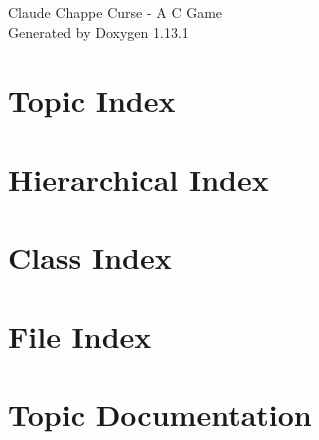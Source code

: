 \documentclass[twoside]{book}
\newcommand{\+}{\discretionary{\mbox{\scriptsize$\hookleftarrow$}}{}{}}
\newcommand{\clearemptydoublepage}{%
    \newpage{\pagestyle{empty}\cleardoublepage}%
  }
\begin{document}
  \raggedbottom
    \hypersetup{pageanchor=false,
                bookmarksnumbered=true,
                pdfencoding=unicode
               }
  \begin{titlepage}
  \vspace*{7cm}
  \begin{center}%
  {\Large Claude Chappe\textquotesingle{} Curse -\/ A C Game}\\
  \vspace*{1cm}
  {\large Generated by Doxygen 1.13.1}\\
  \end{center}
  \end{titlepage}
  \clearemptydoublepage
  \tableofcontents
  \clearemptydoublepage
  \hypersetup{pageanchor=true}

\chapter{Topic Index}

\chapter{Hierarchical Index}

\chapter{Class Index}

\chapter{File Index}

\chapter{Topic Documentation}





























\end{document}
